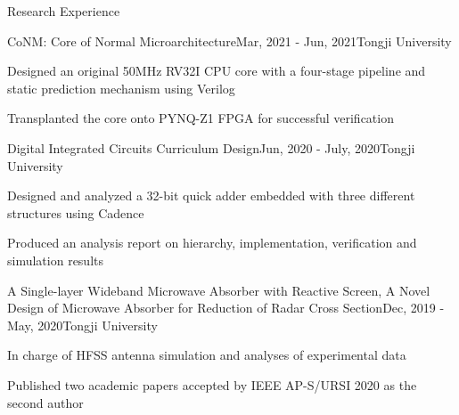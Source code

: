 \documentclass{resume} %
\begin{document}
\begin{rSection}{Research Experience}
	
	\begin{rSubsection}{CoNM: Core of Normal Microarchitecture}{Mar, 2021 - Jun, 2021}{Tongji University}{}
		\item Designed an original 50MHz RV32I CPU core with a four-stage pipeline and static prediction mechanism using Verilog
		\item Transplanted the core onto PYNQ-Z1 FPGA for successful verification
	\end{rSubsection}

	\begin{rSubsection}{Digital Integrated Circuits Curriculum Design}{Jun, 2020 - July, 2020}{Tongji University}{}
		\item Designed and analyzed a 32-bit quick adder embedded with three different structures using Cadence
		\item Produced an analysis report on hierarchy, implementation, verification and simulation results 
	\end{rSubsection}

	\begin{rSubsection}{A Single-layer Wideband Microwave Absorber with Reactive Screen, A Novel Design of Microwave Absorber for Reduction of Radar Cross Section}{Dec, 2019 - May, 2020}{Tongji University}{}
		\item In charge of HFSS antenna simulation and analyses of experimental data
		\item Published two academic papers accepted by IEEE AP-S/URSI 2020 as the second author
	\end{rSubsection}

\end{rSection}
\end{document}
